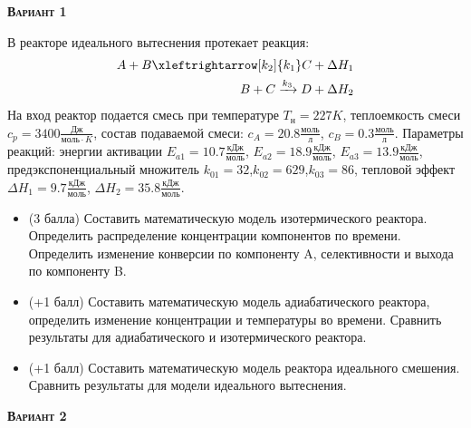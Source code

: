 \textsc{\textbf{Вариант 1}}

 В реакторе идеального вытеснения протекает реакция: \begin{equation*} \begin{aligned} A+B \xleftrightarrow[k_2]{k_1} C + \Delta H_1 \\ B + C \xrightarrow{k_3} D + \Delta H_2 \end{aligned} \end{equation*}                                На вход  реактор подается смесь при температуре $ T_н =  227 K$, теплоемкость смеси $c_p= 3400 \frac{Дж}{моль \cdot K}$, состав подаваемой смеси: $c_A=20.8 \frac{моль}{л}$, $c_B=0.3 \frac{моль}{л}$. Параметры реакций: энергии активации $E_{a1}=10.7 \frac{кДж}{моль}$, $E_{a2}=18.9  \frac{кДж}{моль}$, $E_{a3}=13.9  \frac{кДж}{моль}$, предэкспоненциальный множитель $k_{01}=        32$,$k_{02}=       629$,$k_{03}=        86$, тепловой эффект $\Delta H_1=  9.7  \frac{кДж}{моль}$, $\Delta H_2=35.8 \frac{кДж}{моль}$.\begin{itemize} \item (3 балла) Составить математическую модель изотермического реактора. Определить распределение концентрации компонентов по времени. Определить изменение конверсии по компоненту A, селективности и выхода по компоненту B. \item (+1 балл) Составить математическую модель адиабатического реактора, определить изменение концентрации и температуры во времени. Сравнить результаты для адиабатического и изотермического реактора. \item (+1 балл) Составить математическую модель реактора идеального смешения. Сравнить результаты для модели идеального вытеснения. \end{itemize}

\textsc{\textbf{Вариант 2}}

